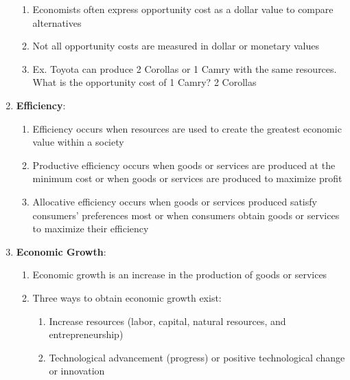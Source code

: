 \documentclass[12pt]{article}
\begin{document}
\begin{enumerate}
\begin{enumerate}
          \item Economists often express opportunity cost as a dollar value to compare alternatives

          \item Not all opportunity costs are measured in dollar or monetary values

          \item Ex. Toyota can produce 2 Corollas or 1 Camry with the same resources. What is the opportunity cost of 1 Camry? 2 Corollas

        \end{enumerate}

      \item \textbf{Efficiency}:

        \begin{enumerate}

          \item Efficiency occurs when resources are used to create the greatest economic value within a society

          \item Productive efficiency occurs when goods or services are produced at the minimum cost or when goods or services are produced to maximize profit

          \item Allocative efficiency occurs when goods or services produced satisfy consumers' preferences most or when consumers obtain goods or services to maximize their efficiency

        \end{enumerate}

      \item \textbf{Economic Growth}:

        \begin{enumerate}

          \item Economic growth is an increase in the production of goods or services

          \item Three ways to obtain economic growth exist:

            \begin{enumerate}

              \item Increase resources (labor, capital, natural resources, and entrepreneurship)

              \item Technological advancement (progress) or positive technological change or innovation


\end{enumerate}
\end{enumerate}
\end{enumerate}
\end{document}
